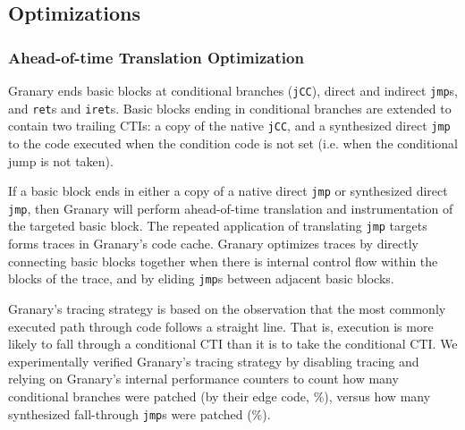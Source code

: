 \documentclass[preprint]{sigplanconf}
\begin{document}

\subsection{Optimizations}

\subsubsection{Ahead-of-time Translation Optimization} \label{sec:aot}
Granary ends basic blocks at conditional branches (\texttt{jCC}), direct and indirect \texttt{jmp}s, and \texttt{ret}s and \texttt{iret}s. Basic blocks ending in conditional branches are extended to contain two trailing CTIs: a copy of the native \texttt{jCC}, and a synthesized direct \texttt{jmp} to the code executed when the condition code is not set (i.e. when the conditional jump is not taken).

If a basic block ends in either a copy of a native direct \texttt{jmp} or synthesized direct \texttt{jmp}, then Granary will perform ahead-of-time translation and instrumentation of the targeted basic block. The repeated application of translating \texttt{jmp} targets forms traces in Granary's code cache. Granary optimizes traces by directly connecting basic blocks together when there is internal control flow within the blocks of the trace, and by eliding \texttt{jmp}s between adjacent basic blocks.

Granary's tracing strategy is based on the observation that the most commonly executed path through code follows a straight line. That is, execution is more likely to fall through a conditional CTI than it is to take the conditional CTI. We experimentally verified Granary's tracing strategy by disabling tracing and relying on Granary's internal performance counters to count how many conditional branches were patched (by their edge code, \%), versus how many synthesized fall-through \texttt{jmp}s were patched (\%).

\end{document}
